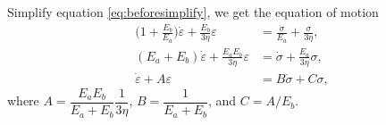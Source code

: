 \documentclass[12pt]{article}
\begin{document}
Simplify equation \eqref{eq:beforesimplify}, we get the equation of motion
\begin{equation}\label{eq:maineq}
  \begin{split}
    \bigg( 1 + \frac{ E_b }{ E_a } \bigg) \dot{\varepsilon} + \frac{ E_b }{ 3 \eta } \varepsilon &= \frac{ \dot{\sigma} }{ E_a } + \frac{ \sigma }{ 3 \eta },\\
    (E_a + E_b) \dot{\varepsilon} + \frac{ E_a E_b }{ 3 \eta } \varepsilon &= \dot{\sigma} + \frac{ E_a }{ 3 \eta } \sigma,\\
    \dot{\varepsilon} + A \varepsilon &= B \dot{\sigma} + C \sigma,
  \end{split}
\end{equation}
where $A = \dfrac{ E_a E_b }{ E_a + E_b } \dfrac{ 1 }{ 3 \eta }$, $B = \dfrac{ 1 }{ E_a + E_b }$, and $C = A / E_b$.
\end{document}
